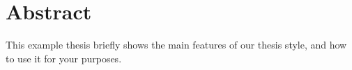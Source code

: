 \chapter*{Abstract}

This example thesis briefly shows the main features of our thesis style, and how to use it for your purposes.
